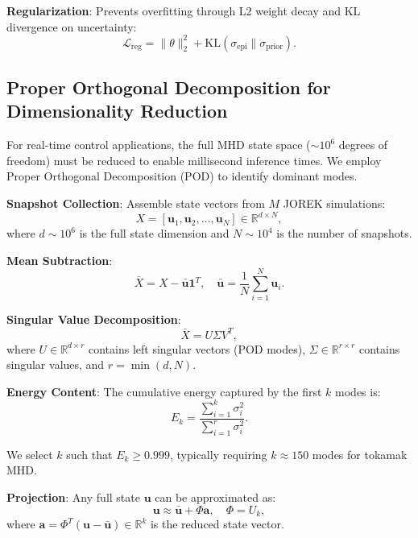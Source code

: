 \documentclass[12pt]{article}
\begin{document}
\textbf{Regularization}: Prevents overfitting through L2 weight decay and KL divergence on uncertainty:
\begin{equation}
\mathcal{L}_{\text{reg}} = \|\theta\|_2^2 + \text{KL}(\sigma_{\text{epi}} \| \sigma_{\text{prior}}).
\end{equation}

\subsection{Proper Orthogonal Decomposition for Dimensionality Reduction}

For real-time control applications, the full MHD state space ($\sim 10^6$ degrees of freedom) must be reduced to enable millisecond inference times. We employ Proper Orthogonal Decomposition (POD) to identify dominant modes.

\textbf{Snapshot Collection}: Assemble state vectors from $M$ JOREK simulations:
\begin{equation}
X = [\mathbf{u}_1, \mathbf{u}_2, \ldots, \mathbf{u}_N] \in \mathbb{R}^{d \times N},
\end{equation}
where $d \sim 10^6$ is the full state dimension and $N \sim 10^4$ is the number of snapshots.

\textbf{Mean Subtraction}:
\begin{equation}
\bar{X} = X - \bar{\mathbf{u}} \mathbf{1}^T, \quad \bar{\mathbf{u}} = \frac{1}{N}\sum_{i=1}^N \mathbf{u}_i.
\end{equation}

\textbf{Singular Value Decomposition}:
\begin{equation}
\bar{X} = U \Sigma V^T,
\end{equation}
where $U \in \mathbb{R}^{d \times r}$ contains left singular vectors (POD modes), $\Sigma \in \mathbb{R}^{r \times r}$ contains singular values, and $r = \min(d, N)$.

\textbf{Energy Content}: The cumulative energy captured by the first $k$ modes is:
\begin{equation}
E_k = \frac{\sum_{i=1}^k \sigma_i^2}{\sum_{i=1}^r \sigma_i^2}.
\end{equation}

We select $k$ such that $E_k \geq 0.999$, typically requiring $k \approx 150$ modes for tokamak MHD.

\textbf{Projection}: Any full state $\mathbf{u}$ can be approximated as:
\begin{equation}
\mathbf{u} \approx \bar{\mathbf{u}} + \Phi \mathbf{a}, \quad \Phi = U_k,
\end{equation}
where $\mathbf{a} = \Phi^T (\mathbf{u} - \bar{\mathbf{u}}) \in \mathbb{R}^k$ is the reduced state vector.
\end{document}
